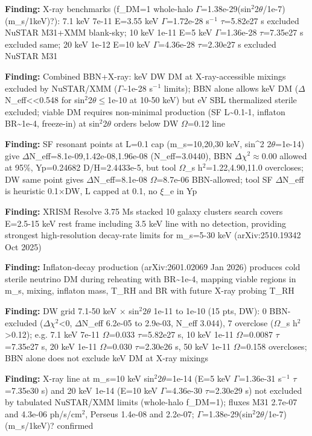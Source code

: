 \documentclass[11pt,a4paper]{article}
\begin{document}
\textbf{Finding:} X-ray benchmarks (f\_DM=1 whole-halo $\Gamma$=1.38e-29(sin$^2$2$\theta$/1e-7)(m\_s/1keV)?): 7.1 keV 7e-11 E=3.55 keV $\Gamma$=1.72e-28 s$^-$$^1$ $\tau$=5.82e27 s excluded NuSTAR M31+XMM blank-sky; 10 keV 1e-11 E=5 keV $\Gamma$=1.36e-28 $\tau$=7.35e27 s excluded same; 20 keV 1e-12 E=10 keV $\Gamma$=4.36e-28 $\tau$=2.30e27 s excluded NuSTAR M31

\textbf{Finding:} Combined BBN+X-ray: keV DW DM at X-ray-accessible mixings excluded by NuSTAR/XMM ($\Gamma$\textasciitilde{}1e-28 s$^-$$^1$ limits); BBN alone allows keV DM ($\Delta$N\_eff\textless{}\textless{}0.548 for sin$^2$2$\theta$$\leq$1e-10 at 10-50 keV) but eV SBL thermalized sterile excluded; viable DM requires non-minimal production (SF L\textasciitilde{}0.1-1, inflaton BR\textasciitilde{}1e-4, freeze-in) at sin$^2$2$\theta$ orders below DW $\Omega$=0.12 line

\textbf{Finding:} SF resonant points at L=0.1 cap (m\_s=10,20,30 keV, sin\textasciicircum{}2 2$\theta$=1e-14) give $\Delta$N\_eff=8.1e-09,1.42e-08,1.96e-08 (N\_eff=3.0440), BBN $\Delta$$\chi$$^2$$\approx$0.00 allowed at 95\%, Yp=0.24682 D/H=2.4433e-5, but tool $\Omega$\_s h$^2$=1.22,4.90,11.0 overcloses; DW same point gives $\Delta$N\_eff=8.1e-08 $\Omega$=8.7e-06 BBN-allowed; tool SF $\Delta$N\_eff is heuristic 0.1$\times$DW, L capped at 0.1, no $\xi$\_e in Yp

\textbf{Finding:} XRISM Resolve 3.75 Ms stacked 10 galaxy clusters search covers E=2.5-15 keV rest frame including 3.5 keV line with no detection, providing strongest high-resolution decay-rate limits for m\_s=5-30 keV (arXiv:2510.19342 Oct 2025)

\textbf{Finding:} Inflaton-decay production (arXiv:2601.02069 Jan 2026) produces cold sterile neutrino DM during reheating with BR\textasciitilde{}1e-4, mapping viable regions in m\_s, mixing, inflaton mass, T\_RH and BR with future X-ray probing T\_RH

\textbf{Finding:} DW grid 7.1-50 keV $\times$ sin$^2$2$\theta$ 1e-11 to 1e-10 (15 pts, DW): 0 BBN-excluded ($\Delta$$\chi$$^2$\textless{}0, $\Delta$N\_eff 6.2e-05 to 2.9e-03, N\_eff 3.044), 7 overclose ($\Omega$\_s h$^2$\textgreater{}0.12); e.g. 7.1 keV 7e-11 $\Omega$=0.033 $\tau$=5.82e27 s, 10 keV 1e-11 $\Omega$=0.0087 $\tau$=7.35e27 s, 20 keV 1e-11 $\Omega$=0.030 $\tau$=2.30e26 s, 50 keV 1e-11 $\Omega$=0.158 overcloses; BBN alone does not exclude keV DM at X-ray mixings

\textbf{Finding:} X-ray line at m\_s=10 keV sin$^2$2$\theta$=1e-14 (E=5 keV $\Gamma$=1.36e-31 s$^-$$^1$ $\tau$=7.35e30 s) and 20 keV 1e-14 (E=10 keV $\Gamma$=4.36e-30 $\tau$=2.30e29 s) not excluded by tabulated NuSTAR/XMM limits (whole-halo f\_DM=1); fluxes M31 2.7e-07 and 4.3e-06 ph/s/cm$^2$, Perseus 1.4e-08 and 2.2e-07; $\Gamma$=1.38e-29(sin$^2$2$\theta$/1e-7)(m\_s/1keV)? confirmed
\end{document}
